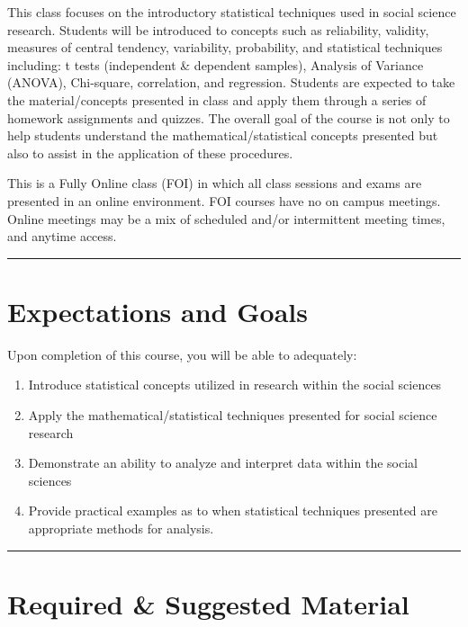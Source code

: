 \documentclass[11pt,]{article}
\providecommand{\tightlist}{%
  \setlength{\itemsep}{0pt}\setlength{\parskip}{0pt}}
\begin{document}
This class focuses on the introductory statistical techniques used in
social science research. Students will be introduced to concepts such as
reliability, validity, measures of central tendency, variability,
probability, and statistical techniques including: t tests (independent
\& dependent samples), Analysis of Variance (ANOVA), Chi-square,
correlation, and regression. Students are expected to take the
material/concepts presented in class and apply them through a series of
homework assignments and quizzes. The overall goal of the course is not
only to help students understand the mathematical/statistical concepts
presented but also to assist in the application of these procedures.

This is a Fully Online class (FOI) in which all class sessions and exams
are presented in an online environment. FOI courses have no on campus
meetings. Online meetings may be a mix of scheduled and/or intermittent
meeting times, and anytime access.

\begin{center}\rule{0.5\linewidth}{0.5pt}\end{center}

\hypertarget{expectations-and-goals}{%
\section{Expectations and Goals}\label{expectations-and-goals}}

Upon completion of this course, you will be able to adequately:

\begin{enumerate}
\def\labelenumi{\arabic{enumi}.}
\tightlist
\item
  Introduce statistical concepts utilized in research within the social
  sciences
\item
  Apply the mathematical/statistical techniques presented for social
  science research
\item
  Demonstrate an ability to analyze and interpret data within the social
  sciences
\item
  Provide practical examples as to when statistical techniques presented
  are appropriate methods for analysis.
\end{enumerate}

\begin{center}\rule{0.5\linewidth}{0.5pt}\end{center}

\hypertarget{required-suggested-material}{%
\section{Required \& Suggested
Material}\label{required-suggested-material}}
\end{document}

